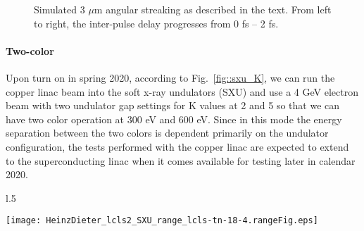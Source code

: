 \begin{figure}[b]
\vspace{-1.5\baselineskip}
\centerline{
}
\vspace{-1.0\baselineskip}
\caption{\label{coffeestains} Simulated 3 $\mu$m angular streaking as described in the text. From left to right, the inter-pulse delay progresses from 0 fs -- 2 fs.}
\end{figure}


\paragraph{Two-color}
Upon turn on in spring 2020, according to Fig.~\ref{fig::sxu_K}, we can run the copper linac beam into the soft x-ray undulators (SXU) and use a 4 GeV electron beam with two undulator gap settings for K values at 2 and 5 so that we can have two color operation at 300 eV and 600 eV. 
Since in this mode the energy separation between the two colors is dependent primarily on the undulator configuration, the tests performed with the copper linac are expected to extend to the superconducting linac when it comes available for testing later in calendar 2020.

\begin{wrapfigure}[27]{l}{.5\linewidth}
\centerline{
	\texttt{[image: HeinzDieter\_lcls2\_SXU\_range\_lcls-tn-18-4.rangeFig.eps]}
	}
	\caption{\label{fig::sxu_K} Soft x-ray undulator tuning range. \cite{HeinzDieter_SXU_twocolor,}
		}
\end{wrapfigure}
